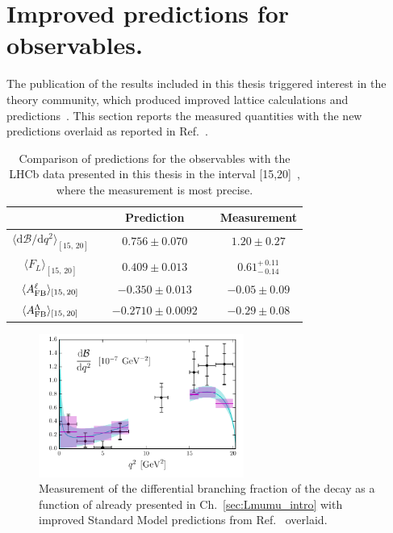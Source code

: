 \chapter{Improved predictions for \decay{\Lb}{\Lz\mumu} observables.}
\label{app:newpredictions}

  The publication of the results included in this thesis triggered interest in the
  theory community, which produced improved lattice calculations and predictions~\cite{Detmold:2016pkz}.
  This section reports the measured quantities with the new predictions overlaid
  as reported in Ref.~\cite{Detmold:2016pkz}.
  
  
  \begin{table}[!h]
   \centering
 \begin{tabular}{c|cccc}
                                                                & \hspace{1ex}  & { \bf Prediction}            & \hspace{1ex}   & { \bf Measurement}              \\
 \hline
 $\langle \mathrm{d}\mathcal{B}/\mathrm{d} q^2\rangle_{[15,\,20]}$             && $0.756 \pm 0.070$    && $1.20\pm0.27$  \\
 $\langle F_L \rangle_{[15,\,20]} $                                         && $0.409 \pm 0.013$    && $0.61^{+\,0.11}_{-\,0.14}$   \\
 $\langle A_{\rm FB}^\ell \rangle_{[15,\,20]} $                             && $-0.350 \pm 0.013$      && $-0.05\pm0.09$    \\
 $\langle A_{\rm FB}^\Lambda \rangle_{[15,\,20]} $                          && $-0.2710 \pm 0.0092$    && $-0.29\pm0.08$      \\
 \end{tabular}
 \caption{Comparison of predictions for the  \decay{\Lb}{\Lz\mumu} observables with the LHCb data presented in this thesis
 in the interval [15,20]~\gevgevcccc, where the measurement is most precise.}
\end{table}

  
  
  \begin{figure}[h!]
\centering
\includegraphics[width=0.6\textwidth]{Lmumu/figs/NewPredictions/fig8.pdf}
\caption{  Measurement of the differential branching fraction of the \decay{\Lb}{\Lz\mumu} decay
	as a function of \qsq already presented in Ch.~\ref{sec:Lmumu_intro} with improved Standard 
	Model predictions from Ref.~\cite{Detmold:2016pkz} overlaid.
 }
\end{figure}

